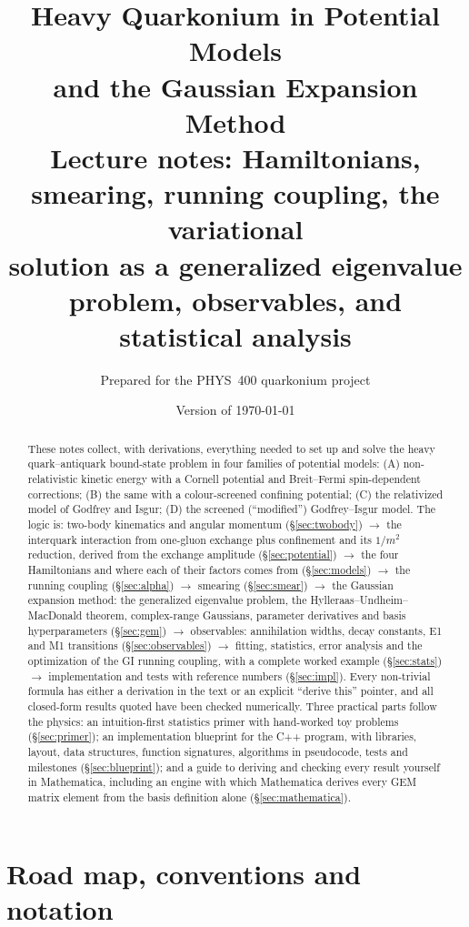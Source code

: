 \documentclass[11pt,a4paper]{article}
\title{\textbf{Heavy Quarkonium in Potential Models\\ and the Gaussian Expansion Method}\\[4pt]
\large Lecture notes: Hamiltonians, smearing, running coupling, the variational\\ solution as a generalized eigenvalue problem, observables, and statistical analysis}
\author{Prepared for the PHYS~400 quarkonium project}
\date{Version of \today}
\numberwithin{equation}{section}
\theoremstyle{definition}
\theoremstyle{plain}
\theoremstyle{remark}
\numberwithin{algorithm}{section}
\begin{document}
\maketitle

\begin{abstract}
These notes collect, with derivations, everything needed to set up and solve the heavy quark--antiquark bound-state problem in four families of potential models:
(A) non-relativistic kinetic energy with a Cornell potential and Breit--Fermi spin-dependent corrections;
(B) the same with a colour-screened confining potential;
(C) the relativized model of Godfrey and Isgur;
(D) the screened (``modified'') Godfrey--Isgur model.
The logic is: two-body kinematics and angular momentum (\S\ref{sec:twobody}) $\to$ the interquark interaction from one-gluon exchange plus confinement and its $1/m^2$ reduction, derived from the exchange amplitude (\S\ref{sec:potential}) $\to$ the four Hamiltonians and where each of their factors comes from (\S\ref{sec:models}) $\to$ the running coupling (\S\ref{sec:alpha}) $\to$ smearing (\S\ref{sec:smear}) $\to$ the Gaussian expansion method: the generalized eigenvalue problem, the Hylleraas--Undheim--MacDonald theorem, complex-range Gaussians, parameter derivatives and basis hyperparameters (\S\ref{sec:gem}) $\to$ observables: annihilation widths, decay constants, E1 and M1 transitions (\S\ref{sec:observables}) $\to$ fitting, statistics, error analysis and the optimization of the GI running coupling, with a complete worked example (\S\ref{sec:stats}) $\to$ implementation and tests with reference numbers (\S\ref{sec:impl}).
Every non-trivial formula has either a derivation in the text or an explicit ``derive this'' pointer, and all closed-form results quoted have been checked numerically.
Three practical parts follow the physics: an intuition-first statistics primer with hand-worked toy problems (\S\ref{sec:primer}); an implementation blueprint for the C++ program, with libraries, layout, data structures, function signatures, algorithms in pseudocode, tests and milestones (\S\ref{sec:blueprint}); and a guide to deriving and checking every result yourself in Mathematica, including an engine with which Mathematica derives every GEM matrix element from the basis definition alone (\S\ref{sec:mathematica}).
\end{abstract}

\tableofcontents
\newpage

\section{Road map, conventions and notation}\label{sec:conv}
\end{document}
